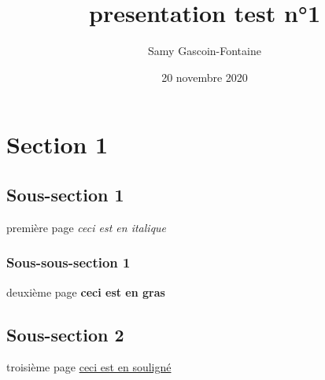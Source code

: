 \documentclass{beamer}
\title{presentation test n°1}
\author{Samy Gascoin-Fontaine}
\date{20 novembre 2020}
\begin{document}
\maketitle
\section{Section 1}
\subsection{Sous-section 1}

\begin{frame}{première page}
\textit{ceci est en italique}
\end{frame}

\subsubsection{Sous-sous-section 1}

\begin{frame}{deuxième page}
\textbf{ceci est en gras}
\end{frame}

\subsection{Sous-section 2}

\begin{frame}{troisième page}
\underline{ceci est en souligné}
\end{frame}
\end{document}
